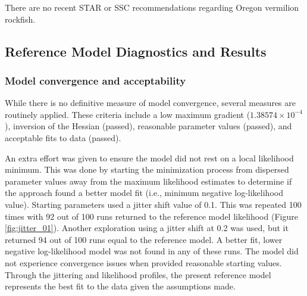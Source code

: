 \documentclass[11pt,
  english,
  a4paper,
]{article}
\begin{document}

There are no recent STAR or SSC recommendations regarding Oregon vermilion rockfish.

\leavevmode\tagmcend\tagstructend\par


\hypertarget{reference-model-diagnostics-and-results}{%
\subsection{Reference Model Diagnostics and Results}\label{reference-model-diagnostics-and-results}}

\leavevmode\tagmcend\tagstructend


\hypertarget{model-convergence-and-acceptability}{%
\subsubsection{Model convergence and acceptability}\label{model-convergence-and-acceptability}}

\leavevmode\tagmcend\tagstructend


While there is no definitive measure of model convergence, several measures are routinely applied. These criteria include a low maximum gradient (\ensuremath{1.38574\times 10^{-4}}), inversion of the Hessian (passed), reasonable parameter values (passed), and acceptable fits to data (passed).

\leavevmode\tagmcend\tagstructend\par


An extra effort was given to ensure the model did not rest on a local likelihood minimum. This was done by starting the minimization process from dispersed parameter values away from the maximum likelihood estimates to determine if the approach found a better model fit (i.e., minimum negative log-likelihood value). Starting parameters used a jitter shift value of 0.1. This was repeated 100 times with 92 out of 100 runs returned to the reference model likelihood (Figure \ref{fig:jitter_01}). Another exploration using a jitter shift at 0.2 was used, but it returned 94 out of 100 runs equal to the reference model. A better fit, lower negative log-likelihood model was not found in any of these runs. The model did not experience convergence issues when provided reasonable starting values. Through the jittering and likelihood profiles, the present reference model represents the best fit to the data given the assumptions made.
\end{document}
